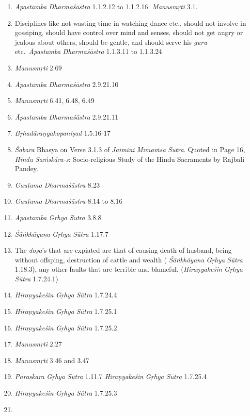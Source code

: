 \begin{enumerate}
\item
  \emph{Āpastamba} \emph{Dharmaśāstra} 1.1.2.12 to 1.1.2.16. \emph{Manusmṛti} 3.1.
\item
  Disciplines like not wasting time in watching dance etc., should not involve in gossiping, should have control over mind and senses, should not get angry or jealous about others, should be gentle, and should serve his \emph{guru} etc.\ \emph{Āpastamba} \emph{Dharmaśāstra} 1.1.3.11 to 1.1.3.24
\item
  \emph{Manusmṛti} 2.69
\item
  \emph{Āpastamba} \emph{Dharmaśāstra} 2.9.21.10
\item
  \emph{Manusmṛti} 6.41, 6.48, 6.49
\item
  \emph{Āpastamba} \emph{Dharmaśāstra} 2.9.21.11
\item
  \emph{Bṛhadāraṇyakopaniṣad} 1.5.16-17
\item
  \emph{Śabara} Bhasya on Verse 3.1.3 of \emph{Jaimini} \emph{Mīmāṁsā} \emph{Sūtra}. Quoted in Page 16, \emph{Hindu} \emph{Saṁskāra-s}: Socio-religious Study of the Hindu Sacraments by Rajbali Pandey.
\item
  \emph{Gautama} \emph{Dharmaśāstra} 8.23
\item
  \emph{Gautama} \emph{Dharmaśāstra} 8.14 to 8.16
\item
  \emph{Āpastamba} \emph{Gṛhya} \emph{Sūtra} 3.8.8
\item
  \emph{Śāṅkhāyana} \emph{Gṛhya} \emph{Sūtra} 1.17.7
\item
  The \emph{doṣa}'s that are expiated are that of causing death of husband, being without offsping, destruction of cattle and wealth ( \emph{Śāṅkhāyana} \emph{Gṛhya} \emph{Sūtra} 1.18.3), any other faults that are terrible and blameful. (\emph{Hiraṇyakeśin} \emph{Gṛhya} \emph{Sūtra} 1.7.24.1)
\item
  \emph{Hiraṇyakeśin} \emph{Gṛhya} \emph{Sūtra} 1.7.24.4
\item
  \emph{Hiraṇyakeśin} \emph{Gṛhya} \emph{Sūtra} 1.7.25.1
\item
  \emph{Hiraṇyakeśin} \emph{Gṛhya} \emph{Sūtra} 1.7.25.2
\item
  \emph{Manusmṛti} 2.27
\item
  \emph{Manusmṛti} 3.46 and 3.47
\item
  \emph{Pāraskara} \emph{Gṛhya} \emph{Sūtra} 1.11.7 \emph{Hiraṇyakeśin} \emph{Gṛhya} \emph{Sūtra} 1.7.25.4
\item
  \emph{Hiraṇyakeśin} \emph{Gṛhya} \emph{Sūtra} 1.7.25.3
\item

\end{enumerate}
